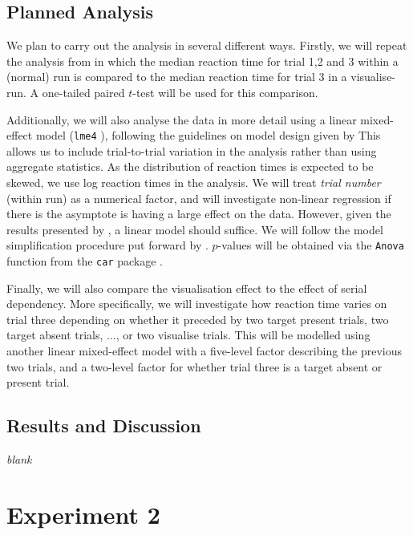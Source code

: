 \documentclass[smallextended]{svjour3}       %
\begin{document}
\subsection{Planned Analysis}

We plan to carry out the analysis in several different ways. Firstly, we will repeat the analysis from \cite{reinhart2015} in which the median reaction time for trial 1,2 and 3 within a (normal) run is compared to the median reaction time for trial 3 in a visualise-run. A one-tailed paired $t$-test will be used for this comparison. 

Additionally, we will also analyse the data in more detail using a linear mixed-effect model (\texttt{lme4} \citep{bates2015, R}), following the guidelines on model design given by \cite{barr2013} This allows us to include trial-to-trial variation in the analysis rather than using aggregate statistics. As the distribution of reaction times is expected to be skewed, we use log reaction times in the analysis. We will treat \textit{trial number} (within run) as a numerical factor, and will investigate non-linear regression if there is the asymptote is having a large effect on the data. However, given the results presented by \cite{reinhart2015}, a linear model should suffice. We will follow the model simplification procedure put forward by \cite[chapter 9]{crawley2012}. $p$-values will be obtained via the \texttt{Anova} function from the \texttt{car} package \citep{fox2011}.

Finally, we will also compare the visualisation effect to the effect of serial dependency. More specifically, we will investigate how reaction time varies on trial three depending on whether it preceded by two target present trials, two target absent trials, $\ldots$, or two visualise trials. This will be modelled using another linear mixed-effect model with a five-level factor describing the previous two trials, and a two-level factor for whether trial three is a target absent or present trial.

\subsection{Results and Discussion}


\centering
\textit{blank}

\section{Experiment 2}
\label{sec:exp2}
\end{document}
